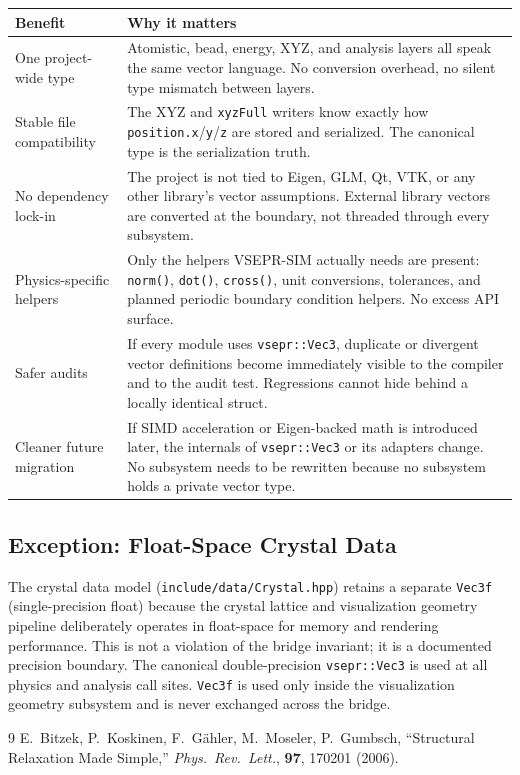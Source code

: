 ﻿\documentclass[11pt]{article}
\newcommand{\file}[1]{\texttt{#1}}
\newcommand{\type}[1]{\texttt{#1}}
\begin{document}
\begin{center}
\begin{tabular}{p{}p{}}
\toprule
Benefit & Why it matters \\
\midrule
One project-wide type &
  Atomistic, bead, energy, XYZ, and analysis layers all speak the same vector
  language. No conversion overhead, no silent type mismatch between layers. \\[4pt]
Stable file compatibility &
  The XYZ and \texttt{xyzFull} writers know exactly how
  \texttt{position.x}/\texttt{y}/\texttt{z} are stored and serialized.
  The canonical type is the serialization truth. \\[4pt]
No dependency lock-in &
  The project is not tied to Eigen, GLM, Qt, VTK, or any other library's
  vector assumptions. External library vectors are converted at the boundary,
  not threaded through every subsystem. \\[4pt]
Physics-specific helpers &
  Only the helpers VSEPR-SIM actually needs are present: \texttt{norm()},
  \texttt{dot()}, \texttt{cross()}, unit conversions, tolerances, and
  planned periodic boundary condition helpers. No excess API surface. \\[4pt]
Safer audits &
  If every module uses \type{vsepr::Vec3}, duplicate or divergent vector
  definitions become immediately visible to the compiler and to the audit
  test. Regressions cannot hide behind a locally identical struct. \\[4pt]
Cleaner future migration &
  If SIMD acceleration or Eigen-backed math is introduced later, the
  internals of \type{vsepr::Vec3} or its adapters change. No subsystem
  needs to be rewritten because no subsystem holds a private vector type. \\
\bottomrule
\end{tabular}
\end{center}

\subsection{Exception: Float-Space Crystal Data}

The crystal data model (\file{include/data/Crystal.hpp}) retains a separate
\type{Vec3f} (single-precision float) because the crystal lattice and
visualization geometry pipeline deliberately operates in float-space for
memory and rendering performance. This is not a violation of the bridge
invariant; it is a documented precision boundary. The canonical double-precision
\type{vsepr::Vec3} is used at all physics and analysis call sites.
\type{Vec3f} is used only inside the visualization geometry subsystem and
is never exchanged across the bridge.

\begin{thebibliography}{9}
  E.~Bitzek, P.~Koskinen, F.~G\"ahler, M.~Moseler, P.~Gumbsch,
  ``Structural Relaxation Made Simple,''
  \emph{Phys.\ Rev.\ Lett.}, \textbf{97}, 170201 (2006).
\end{thebibliography}
\end{document}
